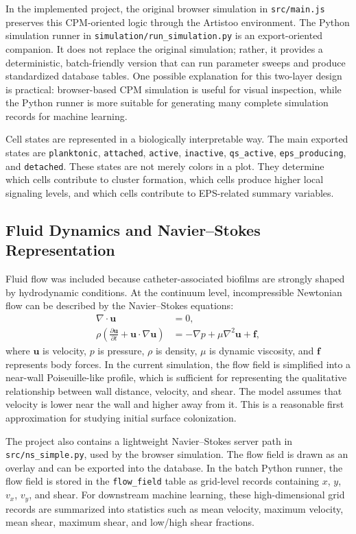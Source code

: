 \documentclass[12pt,a4paper,oneside]{report}
\begin{document}
In the implemented project, the original browser simulation in \texttt{src/main.js} preserves this CPM-oriented logic through the Artistoo environment. The Python simulation runner in \texttt{simulation/run\_simulation.py} is an export-oriented companion. It does not replace the original simulation; rather, it provides a deterministic, batch-friendly version that can run parameter sweeps and produce standardized database tables. One possible explanation for this two-layer design is practical: browser-based CPM simulation is useful for visual inspection, while the Python runner is more suitable for generating many complete simulation records for machine learning.

Cell states are represented in a biologically interpretable way. The main exported states are \texttt{planktonic}, \texttt{attached}, \texttt{active}, \texttt{inactive}, \texttt{qs\_active}, \texttt{eps\_producing}, and \texttt{detached}. These states are not merely colors in a plot. They determine which cells contribute to cluster formation, which cells produce higher local signaling levels, and which cells contribute to EPS-related summary variables.

\subsection{Fluid Dynamics and Navier--Stokes Representation}
Fluid flow was included because catheter-associated biofilms are strongly shaped by hydrodynamic conditions. At the continuum level, incompressible Newtonian flow can be described by the Navier--Stokes equations:
\begin{align}
\nabla \cdot \mathbf{u} &= 0,\\
\rho\left(\frac{\partial \mathbf{u}}{\partial t}+\mathbf{u}\cdot\nabla\mathbf{u}\right) &= -\nabla p + \mu\nabla^2\mathbf{u}+\mathbf{f},
\end{align}
where \(\mathbf{u}\) is velocity, \(p\) is pressure, \(\rho\) is density, \(\mu\) is dynamic viscosity, and \(\mathbf{f}\) represents body forces. In the current simulation, the flow field is simplified into a near-wall Poiseuille-like profile, which is sufficient for representing the qualitative relationship between wall distance, velocity, and shear. The model assumes that velocity is lower near the wall and higher away from it. This is a reasonable first approximation for studying initial surface colonization.

The project also contains a lightweight Navier--Stokes server path in \texttt{src/ns\_simple.py}, used by the browser simulation. The flow field is drawn as an overlay and can be exported into the database. In the batch Python runner, the flow field is stored in the \texttt{flow\_field} table as grid-level records containing \(x\), \(y\), \(v_x\), \(v_y\), and shear. For downstream machine learning, these high-dimensional grid records are summarized into statistics such as mean velocity, maximum velocity, mean shear, maximum shear, and low/high shear fractions.
\end{document}
